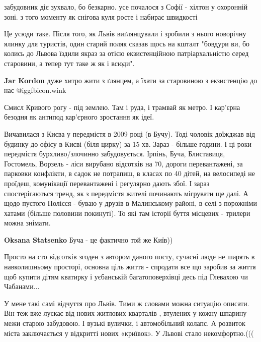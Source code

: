 \begin{itemize}
забудовник діє зухвало, бо безкарно.
усе почалося з Софії - хілтон у охоронній зоні. з того моменту як снігова куля росте і набирає швидкості


Це усюди таке. Після того, як Львів виґлянцували і зробили з нього новорічну
ялинку для туристів, один старий поляк сказав щось на кшталт "бовдури ви, бо
колись до Львова їздили якраз за отією екзистенційною патріархальністю серед
старовини, а тепер тут таке ж як і всюди".

\begin{itemize} %
\textbf{Jar Kordon} дуже хитро жити з ґлянцем, а їхати за старовиною з екзистенцію до нас  @igg{fbicon.wink} 
\end{itemize} %

Смисл Кривого рогу - під землею. Там і руда, і трамвай як метро. І кар’єрна безодня як антипод кар’єрного зростання як ідеї.


Вичавилася з Києва у передмістя в 2009 році (в Бучу). Тоді чоловік доїжджав від
будинку до офісу в Києві (біля цирку) за 15 хв. Зараз - більше години. І ці
роки передмістя бурхливо/злочинно забудовується. Ірпінь, Буча, Блиставиця,
Гостомель, Ворзель - ліси вирубано відсотків на 70, дороги перевантажені, за
парковки конфлікти, в садок не потрапиш, в класах по 40 дітей, на велосипеді не
проїдеш, комунікації перевантажені і регулярно дають збої. І зараз
спостерігаються тренд, як з передмістя жителі починають мігрувати ще далі. А
щодо пустого Полісся - буваю у друзів в Малинському районі, в селі з порожніми
хатами (більше половини покинуті). То які там історії буття місцевих - трилери
можна знімати.

\begin{itemize} %
\textbf{Oksana Statsenko} Буча - це фактично той же Київ))
\end{itemize} %

Просто на сто відсотків згоден з автором даного посту, сучасні люде не шарять в навколишньому просторі, основна ціль життя - спродати все що заробив за життя щоб купити дітям кватирку і уєбанській багатоповерхівці десь під Глевахою чи Чабанами...

У мене такі самі відчуття про Львів. Тими ж словами можна ситуацію описати. Він теж вже лускає від нових житлових кварталів , втулених у кожну шпарину межи старою забудовою. І вузькі вулички, і автомобільний колапс. А розвиток міста заключається у відкритті нових «криївок». У Львові стало некомфортно.(((


\end{itemize}
